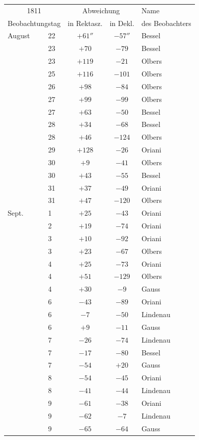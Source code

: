 \begin{center}

\fontsize{10}{12}\selectfont\setlength{\tabcolsep}{7pt}\renewcommand{\arraystretch}{1.05}\begin{tabular}{ll|c|c|l}
\multicolumn{2}{c|}{1811} & \multicolumn{2}{c|}{Abweichung} & Name \\
\multicolumn{2}{c|}{Beobachtungstag} & in Rektasz. & in Dekl. & des Beobachters \\\hline
August & 22 & $+61''$ & $-57''$ & Bessel \\
 & 23 & $+70$ & $-79$ & Bessel \\
 & 23 & $+119$ & $-21$ & Olbers \\
 & 25 & $+116$ & $-101$ & Olbers \\
 & 26 & $+98$ & $-84$ & Olbers \\
 & 27 & $+99$ & $-99$ & Olbers \\
 & 27 & $+63$ & $-50$ & Bessel \\
 & 28 & $+34$ & $-68$ & Bessel \\
 & 28 & $+46$ & $-124$ & Olbers \\
 & 29 & $+128$ & $-26$ & Oriani \\
 & 30 & $+9$ & $-41$ & Olbers \\
 & 30 & $+43$ & $-55$ & Bessel \\
 & 31 & $+37$ & $-49$ & Oriani \\
 & 31 & $+47$ & $-120$ & Olbers \\
Sept. & 1 & $+25$ & $-43$ & Oriani \\
 & 2 & $+19$ & $-74$ & Oriani \\
 & 3 & $+10$ & $-92$ & Oriani \\
 & 3 & $+23$ & $-67$ & Olbers \\
 & 4 & $+25$ & $-73$ & Oriani \\
 & 4 & $+51$ & $-129$ & Olbers \\
 & 4 & $+30$ & $-9$ & Gauss \\
 & 6 & $-43$ & $-89$ & Oriani \\
 & 6 & $-7$ & $-50$ & Lindenau \\
 & 6 & $+9$ & $-11$ & Gauss \\
 & 7 & $-26$ & $-74$ & Lindenau \\
 & 7 & $-17$ & $-80$ & Bessel \\
 & 7 & $-54$ & $+20$ & Gauss \\
 & 8 & $-54$ & $-45$ & Oriani \\
 & 8 & $-41$ & $-44$ & Lindenau \\
 & 9 & $-61$ & $-38$ & Oriani \\
 & 9 & $-62$ & $-7$ & Lindenau \\
 & 9 & $-65$ & $-64$ & Gauss \\
\end{tabular}
\end{center}
